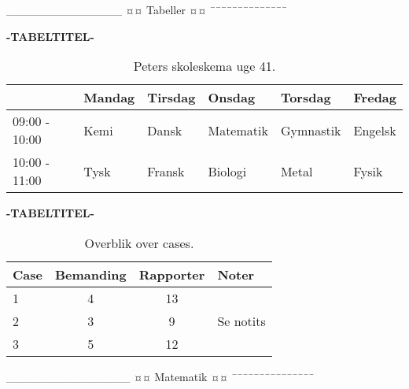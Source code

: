 ______________
¤¤ Tabeller ¤¤
¯¯¯¯¯¯¯¯¯¯¯¯¯¯
\begin{table}[H] 
	\centering
	\caption*{\textbf{\large -TABELTITEL-}} 
	\vspace{-0.3cm}
	\begin{tabular}{|l|l|l|l|l|l|} %
		\hline 	%
					  & Mandag & Tirsdag & Onsdag    & Torsdag   & Fredag  \\ \hline 	%
		09:00 - 10:00 & Kemi   & Dansk   & Matematik & Gymnastik & Engelsk \\ \hline 
		10:00 - 11:00 & Tysk   & Fransk  & Biologi   & Metal     & Fysik   \\ \hline 
	\end{tabular} 
	\caption{Peters skoleskema uge 41.} 
	\label{tab:skoleskema} 
\end{table}
\begin{table}[H]
\caption*{\textbf{\large -TABELTITEL-}} \vspace{-0.3cm}
	\centering
	\begin{tabular}{lccl}	%
		\toprule
		Case & Bemanding & Rapporter & Noter \\\midrule
		1 & 4 & 13 &            \\
		2 & 3 & 9  & Se notits  \\
		3 & 5 & 12 &            \\
		\bottomrule
	\end{tabular}
	\caption{Overblik over cases.}
	\label{tab:cases}
\end{table}


_______________
¤¤ Matematik ¤¤
¯¯¯¯¯¯¯¯¯¯¯¯¯¯¯


